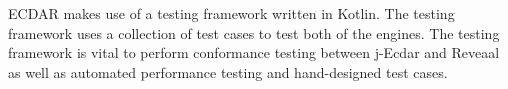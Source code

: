 ECDAR makes use of a testing framework written in Kotlin. 
The testing framework uses a collection of test cases to test both of the engines. 
The testing framework is vital to perform conformance testing between j-Ecdar and Reveaal as well as automated performance testing and hand-designed test cases. 